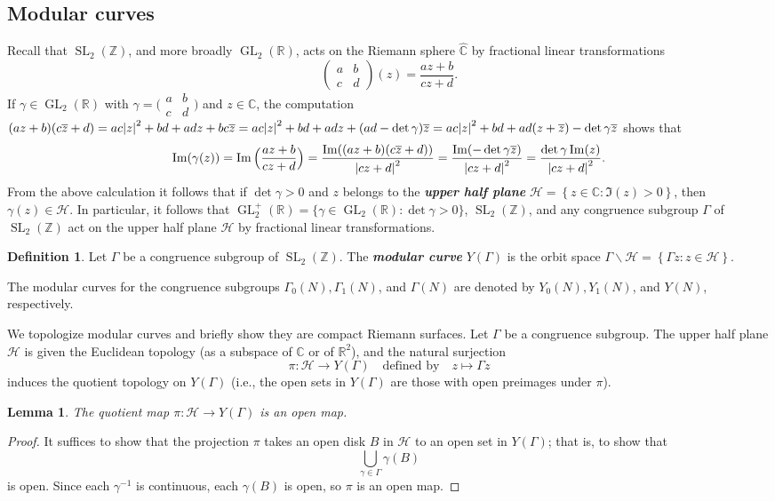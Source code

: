 \documentclass[10pt,leqno,twoside,b5paper]{article}
\theoremstyle{plain}
\newtheorem{lemma}[lem]{Lemma}
\theoremstyle{definition}
\newtheorem{definition/}[lem]{Definition}
\newenvironment{definition}
  {\renewcommand{\qedsymbol}{\textdagger}%
   \pushQED{\qed}\begin{definition/}}
  {\popQED\end{definition/}}
\numberwithin{equation}{section}
\numberwithin{lem}{section}
\newcommand{\cbr}[1]{\left\{#1\right\}}
\newcommand{\textib}[1]{\textbf{\textit{#1\index{#1}}}} %
\DeclareMathOperator{\GL}{GL}
\DeclareMathOperator{\SL}{SL}
\newcommand{\smallabcd}{\big(\!\begin{smallmatrix}
    a & b \\ c & d
\end{smallmatrix}\!\big)}
\newcommand{\abcd}{\begin{pmatrix}
    a & b \\ c & d
\end{pmatrix}}
\newcommand{\slz}{\SL_2(\mathbb{Z})}
\newcommand{\glr}{\GL_2(\mathbb{R})}
\newcommand{\glrp}{\GL_2^+(\mathbb{R})}
\begin{document}
\subsection{Modular curves}
Recall that $\slz$, and more broadly $\glr$, acts on the Riemann sphere $\widehat{\mathbb{C}}$ by fractional linear transformations \[\abcd(z) = \frac{az+b}{cz+d}.\] 
If $\gamma\in \glr$ with $\gamma = \smallabcd$ and $z\in \mathbb C$, the computation $(az+b)(c\overline z + d) = ac\abs{z}^2+bd + adz + bc\overline z = ac\abs{z}^2+bd + adz + (ad-\det\gamma)\overline z = ac\abs{z}^2+bd + ad(z+\overline z) -\det\gamma\overline z$ shows that
\begin{equation}\label{eqn: imaginary parts}
    \Im(\gamma(z)) = \Im\Big(\frac{az+b}{cz+d}\Big) = \frac{\Im((az+b)(c\overline z + d))}{\abs{cz+d}^2} = \frac{\Im(-\det\gamma\overline z)}{\abs{cz+d}^2} = \frac{\det\gamma\Im(z)}{\abs{cz+d}^2}.
\end{equation}
From the above calculation it follows that if $\det \gamma >0$ and $z$ belongs to the \textib{upper half plane} $\mathcal{H} = \cbr{z\in\mathbb{C} : \Im(z)>0}$, then $\gamma(z)\in\mathcal H$. In particular, it follows that $\glrp = \{\gamma\in \glr : \det \gamma > 0\}$, $\slz$, and any congruence subgroup $\varGamma$ of $\slz$ act on the upper half plane $\mathcal H$ by fractional linear transformations.

\begin{definition}
    Let $\varGamma$ be a congruence subgroup of $\slz$. The \textib{modular curve} $Y(\varGamma)$ is the orbit space $\varGamma\backslash \mathcal{H} = \cbr{\varGamma z : z\in\mathcal H}$.
\end{definition}
The modular curves for the congruence subgroups $\varGamma_0(N), \varGamma_1(N)$, and $\varGamma(N)$ are denoted by $Y_0(N), Y_1(N)$, and $Y(N)$, respectively.

We topologize modular curves and briefly show they are compact Riemann surfaces. Let $\varGamma$ be a congruence subgroup. The upper half plane $\mathcal H$ is given the Euclidean topology (as a subspace of $\mathbb{C}$ or of $\mathbb{R}^2$), and the natural surjection \[\pi \colon \mathcal H \to Y(\varGamma)\quad \text{defined by}\quad  z\mapsto \varGamma z\] induces the quotient topology on $Y(\varGamma)$ (i.e., the open sets in $Y(\varGamma)$ are those with open preimages under $\pi$).

\begin{lemma}\label{lem: slz acts as open maps}
    The quotient map $\pi \colon \mathcal H \to Y(\varGamma)$ is an open map.
\end{lemma}
\begin{proof}
    It suffices to show that the projection $\pi$ takes an open disk $B$ in $\mathcal{H}$ to an open set in $Y(\varGamma)$; that is, to show that \[\bigcup_{\gamma\in \varGamma}\gamma(B)\] is open. Since each $\gamma^{-1}$ is continuous, each $\gamma(B)$ is open, so $\pi$ is an open map.
\end{proof}
\end{document}
